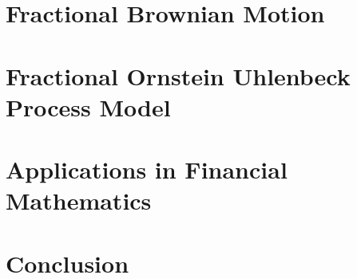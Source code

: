 \documentclass[a4paper, twoside, 11pt]{article}
\theoremstyle{definition}
\begin{document}
\section{Fractional Brownian Motion}

\newpage

\section{Fractional Ornstein Uhlenbeck Process Model}

\newpage

\section{Applications in Financial Mathematics}

\newpage

\section{Conclusion}

\newpage

\fancyhead[LO, RE]{}
\begin{thebibliography}{99}

\end{thebibliography}
\newpage
\end{document}
